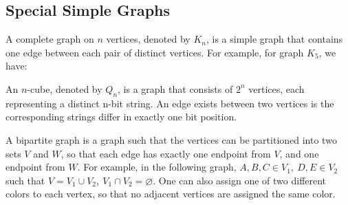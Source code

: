 \subsection{Special Simple Graphs}
A complete graph on \(n\) vertices, denoted by \(K_n\), is a simple graph that contains one edge between each pair of distinct vertices. For example, for graph \(K_5\), we have:
\begin{figure}[H]
  \centering
\end{figure}

An \(n\)-cube, denoted by \(Q_n\), is a graph that consists of \(2^n\)  vertices, each representing a distinct n-bit string. An edge exists between two vertices is the corresponding strings differ
in exactly one bit position.

A bipartite graph is a graph such that the vertices can be partitioned into two sets \(V\) and \(W\), so that each edge has exactly one endpoint from \(V\), and one endpoint from \(W\). For example, in the following graph, \(A, B, C \in V_1,\ D, E \in V_2\) such that \(V = V_1 \cup V_2,\ V_1 \cap V_2 = \varnothing\). One can also assign one of two different colors to each vertex, so that no adjacent vertices are assigned the same color. 
\begin{figure}[H]
  \centering
\end{figure}

